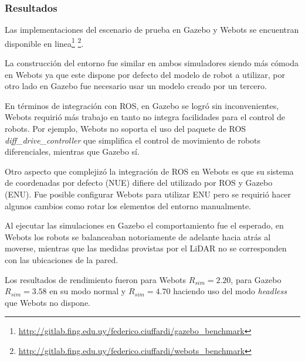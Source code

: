 \subsubsection{Resultados}
Las implementaciones del escenario de prueba en Gazebo y Webots se encuentran
disponible en linea\footnote{\url{http://gitlab.fing.edu.uy/federico.ciuffardi/gazebo_benchmark}}
\footnote{\url{http://gitlab.fing.edu.uy/federico.ciuffardi/webots_benchmark}}. 

La construcción del entorno fue similar en ambos simuladores siendo
más cómoda en Webots ya que este dispone por defecto del modelo de robot a
utilizar, por otro lado en Gazebo fue necesario usar un modelo creado por un
tercero.

En términos de integración con ROS, en Gazebo se logró sin inconvenientes,
Webots requirió más trabajo en tanto no integra facilidades para el control de
robots. Por ejemplo, Webots no soporta el uso del paquete de ROS
\emph{diff\_drive\_controller} \cite{diff_drive_controller} que simplifica el
control de movimiento de robots diferenciales, mientras que Gazebo sí.

Otro aspecto que complejizó la integración de ROS en Webots es que su sistema
de coordenadas por defecto (NUE) difiere del utilizado por ROS y Gazebo (ENU).
Fue posible configurar Webots para utilizar ENU pero se requirió hacer algunos
cambios como rotar los elementos  del entorno manualmente.

Al ejecutar las simulaciones en Gazebo el comportamiento fue el esperado, en
Webots los robots se balanceaban notoriamente de adelante hacia atrás al
moverse, mientras que las medidas provistas por el LiDAR no se corresponden con
las ubicaciones de la pared.

Los resultados de rendimiento fueron para Webots $R_{sim}=2.20$, para Gazebo $R_{sim}=3.58$
en su modo normal y $R_{sim}=4.70$ haciendo uso del modo \emph{headless} que Webots no dispone.

